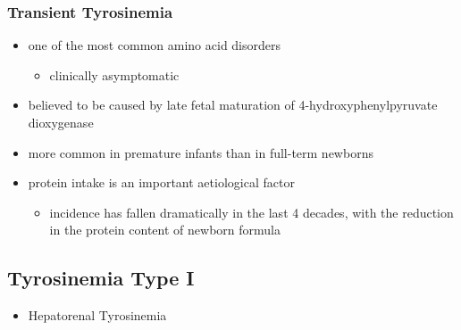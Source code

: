 \documentclass{scrartcl}
\begin{document}
\subsubsection{Transient Tyrosinemia}
\label{sec:orgcc63623}
\begin{itemize}
\item one of the most common amino acid disorders
\begin{itemize}
\item clinically asymptomatic
\end{itemize}
\item believed to be caused by late fetal maturation of
4-hydroxyphenylpyruvate dioxygenase
\item more common in premature infants than in full-term newborns
\item protein intake is an important aetiological factor
\begin{itemize}
\item incidence has fallen dramatically in the last 4 decades, with the
reduction in the protein content of newborn formula
\end{itemize}
\end{itemize}


\subsection{Tyrosinemia Type I}
\label{sec:org7419194}
\begin{itemize}
\item Hepatorenal Tyrosinemia
\end{itemize}
\end{document}
